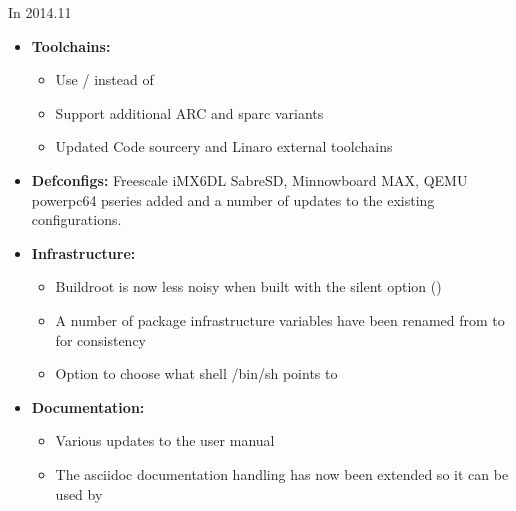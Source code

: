 \begin{frame}{In 2014.11}
  \begin{itemize}
  \item {\bf Toolchains:}
    \begin{itemize}
    \item Use  /  instead of 
    \item Support additional ARC and sparc variants
    \item Updated Code sourcery and Linaro external toolchains
    \end{itemize}
  \item {\bf Defconfigs:} Freescale iMX6DL SabreSD, Minnowboard MAX,
    QEMU powerpc64 pseries added and a number of updates to the
    existing configurations.
  \item {\bf Infrastructure:}
    \begin{itemize}
    \item Buildroot is now less noisy when built with the silent
      option ()
    \item A number of package infrastructure variables have been
      renamed from  to  for consistency
    \item Option to choose what shell /bin/sh points to
    \end{itemize}
  \item {\bf Documentation:}
    \begin{itemize}
    \item Various updates to the user manual
    \item The asciidoc documentation handling has now been extended so
      it can be used by 
    \end{itemize}
  \end{itemize}
\end{frame}

